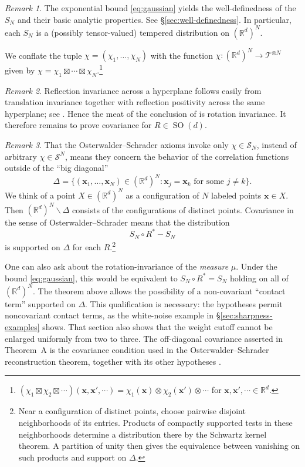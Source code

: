 \documentclass[11pt, letterpaper, reqno]{amsart}
\theoremstyle{definition}
\theoremstyle{remark}
\newtheorem*{remark*}{Remark}
\newcommand{\bbR}{\mathbb{R}}
\newcommand{\calS}{\mathcal{S}}
\newcommand{\calT}{\mathcal{T}}
\newcommand{\bfx}{\mathbf{x}}
\begin{document}
\begin{remark*}
    The exponential bound \cref{eq:gaussian} yields the well-definedness of the $S_N$ and their basic analytic properties. See \S\ref{sec:well-definedness}. In particular, each $S_N$ is a (possibly tensor-valued) tempered distribution on $(\bbR^d)^N$. 
    
    We conflate the tuple $\chi=(\chi_1,\dots,\chi_N)$ with the function $\chi:(\bbR^d)^N\to \calT^{\otimes N}$ given by $\chi=\chi_1\boxtimes \cdots \boxtimes \chi_N$.\footnote{$(\chi_1\boxtimes \chi_2\boxtimes \cdots )(\bfx,\bfx',\cdots)=\chi_1(\bfx)\otimes\chi_2(\bfx')\otimes\cdots$ for $\bfx,\bfx',\cdots \in \bbR^d$.} 
\end{remark*}
\begin{remark*}
    Reflection invariance across a hyperplane follows easily from translation invariance together with reflection positivity across the same hyperplane; see . Hence the meat of the conclusion of  is rotation invariance. 
    It therefore remains to prove covariance for $R\in \operatorname{SO}(d)$. 
\end{remark*}

\begin{remark*}
    That the Osterwalder--Schrader axioms invoke only $\chi\in \calS_N$, instead of arbitrary $\chi\in \calS^N$, means they concern the behavior of the correlation functions outside of the ``big diagonal'' 
    \begin{equation}
        \Delta = \{(\bfx_1,\dots,\bfx_N) \in (\bbR^d)^N : \bfx_j=\bfx_k\text{ for some }j\neq k  \}.
    \end{equation}
    We think of a point $X\in (\bbR^d)^N$ as a configuration of $N$ labeled points $\bfx\in X$. Then $(\bbR^d)^N\backslash \Delta$ consists of the configurations of distinct points. 
    Covariance in the sense of Osterwalder--Schrader means that the distribution 
    \begin{equation}
        S_N\circ R^* -S_N
    \end{equation}
    is supported on $\Delta$ for each $R$.\footnote{
    Near a configuration of distinct points, choose pairwise disjoint neighborhoods of its entries. Products of compactly supported tests in these neighborhoods determine a distribution there by the Schwartz kernel theorem. A partition of unity then gives the equivalence between vanishing on such products and support on $\Delta$.
    }

    One can also ask about the rotation-invariance of the \emph{measure} $\mu$. Under the bound \cref{eq:gaussian}, this would be equivalent to $S_N\circ R^*=S_N$ holding on all of $(\bbR^d)^N$. The theorem above allows the possibility of a non-covariant ``contact term'' supported on $\Delta$. 
    This qualification is necessary: the hypotheses permit noncovariant contact terms, as the white-noise example in \S\ref{sec:sharpness-examples} shows. That section also shows that the weight cutoff cannot be enlarged uniformly from two to three. 
    The off-diagonal covariance asserted in Theorem~A is the covariance condition used in the Osterwalder--Schrader reconstruction theorem, together with its other hypotheses \cite{OS,OS2}. 
\end{remark*}
\end{document}
